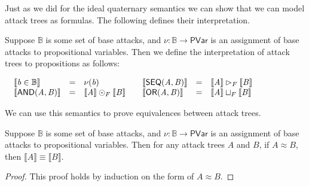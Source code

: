 \documentclass{llncs}
\let\mto\to
\let\to\relax
\newcommand{\to}{\rightarrow}
\newcommand{\interp}[1]{\llbracket #1 \rrbracket}
\newcommand{\ATermsnt}[1]{\mathit{#1}}
\newcommand{\ATermsmv}[1]{\mathit{#1}}
\begin{document}
Just as we did for the ideal quaternary semantics we can show that we
can model attack trees as formulas.  The following defines their
interpretation.
\begin{definition}
  \label{def:interp-aterms-quaternary}
  Suppose $\mathbb{B}$ is some set of base attacks, and $\nu :
  \mathbb{B} \mto \mathsf{PVar}$ is an assignment of base attacks to
  propositional variables.  Then we define the interpretation of
  attack trees to propositions as follows:
  \begin{center}
    \begin{math}
      \setlength{\arraycolsep}{5px}
      \begin{array}{lll}
        \begin{array}{lll}
          \interp{\ATermsmv{b} \in \mathbb{B}} & = & \nu(\ATermsmv{b})\\
          \interp{ \mathsf{AND}( \ATermsnt{A} , \ATermsnt{B} ) } & = & \interp{\ATermsnt{A}} \odot_F \interp{\ATermsnt{B}}
        \end{array}
        &
        \begin{array}{lll}
          \interp{ \mathsf{SEQ}( \ATermsnt{A} , \ATermsnt{B} ) } & = & \interp{\ATermsnt{A}} \rhd_F \interp{\ATermsnt{B}}\\
          \interp{ \mathsf{OR}( \ATermsnt{A} , \ATermsnt{B} ) } & = & \interp{\ATermsnt{A}} \sqcup_F \interp{\ATermsnt{B}}
        \end{array}
      \end{array}
    \end{math}
  \end{center}
\end{definition}
We can use this semantics to prove equivalences between attack trees.
\begin{lemma}
  \label{lemma:equivalence_of_attack_trees}
  Suppose $\mathbb{B}$ is some set of base attacks, and $\nu :
  \mathbb{B} \mto \mathsf{PVar}$ is an assignment of base attacks to
  propositional variables.  Then for any attack trees $\ATermsnt{A}$ and
  $\ATermsnt{B}$, if $ \ATermsnt{A}  \approx  \ATermsnt{B} $, then $\interp{\ATermsnt{A}} \equiv
  \interp{\ATermsnt{B}}$.
\end{lemma}
\begin{proof}
  This proof holds by induction on the form of $ \ATermsnt{A}  \approx  \ATermsnt{B} $.
\end{proof}

\end{document}
